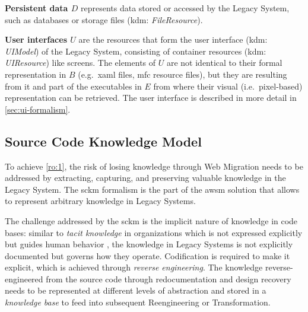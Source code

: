\textbf{Persistent data \(D\)} represents data stored or accessed by the \gls{Legacy System}, such as databases or storage files (\gls{kdm}: \emph{FileResource}).

\textbf{User interfaces \(U\)} are the resources that form the user interface (\gls{kdm}: \emph{UIModel}) of the \gls{Legacy System}, consisting of container resources (\gls{kdm}: \emph{UIResource}) like screens.
The elements of \(U\) are not identical to their formal representation in \(B\) (e.g.~\gls{xaml} files, \gls{mfc} resource files), but they are resulting from it and part of the executables in \(E\) from where their visual (i.e.~pixel-based) representation can be retrieved.
The  user interface is described in more detail in \cref{sec:ui-formalism}.

\vspace{-10pt}
\hypertarget{sec:formalisms.sckm}{%
\subsection{Source Code Knowledge Model}\label{sec:formalisms.sckm}}
\vspace{10pt}

To achieve \cref{ro:1}, the risk of losing knowledge through \gls{Web Migration} needs to be addressed by extracting, capturing, and preserving valuable knowledge in the \gls{Legacy System}.
The \gls{sckm} formalism is the part of the \gls{awsm} solution that allows to represent arbitrary knowledge in \glspl{Legacy System}.


The challenge addressed by the \gls{sckm} is the implicit nature of knowledge in  code bases: similar to \emph{tacit knowledge} in organizations which is
not expressed explicitly but guides human behavior \autocite{Nonaka2008TacitKnowledge}, the knowledge in \glspl{Legacy System} is not explicitly documented but governs how they operate.
Codification is required to make it explicit, which is achieved through \emph{reverse engineering}.
The knowledge reverse-engineered from the  source code through redocumentation and design recovery needs to be represented at different levels of abstraction and stored in a \emph{knowledge base} to feed into subsequent \gls{Reengineering} or \gls{Transformation}.


